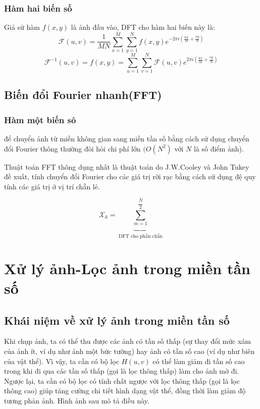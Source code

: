 \documentclass[12pt,a4paper]{report}
\numberwithin{equation}{section}
\theoremstyle{definition} %
\begin{document}
\subsubsection{Hàm hai biến số}
Giả sử hàm $f(x,y)$ là ảnh đầu vào, DFT cho hàm hai biến này là: 
\begin{equation}
\mathcal{F}(u,v) = \dfrac{1}{MN}\sum_{x=1}^{M}\sum_{y=1}^{N} f(x,y)e^{-2\pi i\left(\frac{ux}{M}+\frac{vy}{N}\right)}
\end{equation}
\begin{equation}
\mathcal{F}^{-1}(u,v)=f(x,y) =\sum_{u=1}^{M}\sum_{v=1}^{N} \mathcal{F}(u,v)e^{2\pi i\left(\frac{ux}{M}+\frac{vy}{N}\right)}
\end{equation}
\subsection{Biến đổi Fourier nhanh(FFT)}
\subsubsection{Hàm một biến sô}
để chuyển ảnh từ miền không gian sang miền tần số bằng cách sử dụng chuyển đổi Fourier thông thường đòi hỏi chi phí lớn $(O(N^2)$ với $N$ là số điểm ảnh).

Thuật toán FFT thông dụng nhất là thuật toán do J.W.Cooley và John Tukey đề xuất, tính chuyển đổi Fourier cho các giá trị rời rạc bằng cách sử dụng đệ quy tính các giá trị ở vị trí chẵn lẻ. 


\begin{equation}
\mathcal{X}_k = \underbrace{\sum_{m=1}^{\dfrac{N}{2}}}_{ \text{DFT cho phần chẵn}}
\end{equation}
\section{Xử lý ảnh-Lọc ảnh trong miền tần số}
\subsection{Khái niệm về xử lý ảnh trong miền tần số}
Khi chụp ảnh, ta có thể thu được các ảnh có tần số thấp (sự thay đổi mức xám của ảnh ít, ví dụ như ảnh một bức tường) hay ảnh có tần số cao (ví dụ như biên của vật thể). Vì vậy, ta cần có bộ lọc $H(u,v)$ có thể làm giảm đi tần số cao trong khi đi qua các tần số thấp (gọi là lọc thông thấp) làm cho ảnh mờ đi. Ngược lại, ta cần có bộ lọc có tính chất ngược với lọc thông thấp (gọi là lọc thông cao) giúp tăng cường chi tiết hình dạng vật thể, đồng thời làm giảm độ tương phản ảnh. Hình ảnh sau mô tả điều này.
\end{document}
